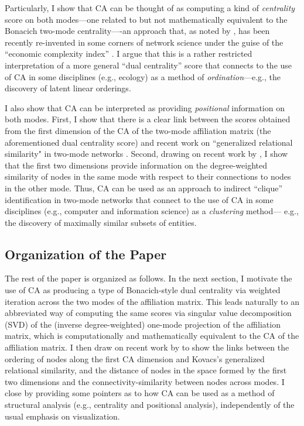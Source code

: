 \documentclass[a4paper,fleqn]{cas-sc}
\begin{document}
Particularly, I show that CA can be thought of as computing a kind of \textit{centrality} score on both modes---one related to but not mathematically equivalent to the Bonacich \citeyearpar{bonacich1991simultaneous} two-mode centrality----an approach that, as noted by \citet{van2021correspondence}, has been recently re-invented in some corners of network science under the guise of the ``economic complexity index'' \citep{hidalgo2009building, mealy2019interpreting}. I argue that this is a rather restricted interpretation of a more general ``dual centrality'' score that connects to the use of CA in some disciplines (e.g., ecology) as a method of \textit{ordination}---e.g., the discovery of latent linear orderings. 

I also show that CA can be interpreted as providing \textit{positional} information on both modes. First, I show that there is a clear link between the scores obtained from the first dimension of the CA of the two-mode affiliation matrix (the aforementioned dual centrality score) and recent work on ``generalized relational similarity" in two-mode networks \citep{kovacs2010generalized, lizardo2024two}. Second, drawing on recent work by \citet{van2021correspondence}, I show that the first two dimensions provide information on the degree-weighted similarity of nodes in the same mode with respect to their connections to nodes in the other mode. Thus, CA can be used as an approach to indirect ``clique'' identification in two-mode networks that connect to the use of CA in some disciplines (e.g., computer and information science) as a \textit{clustering} method--- e.g., the discovery of maximally similar subsets of entities. 

\subsection{Organization of the Paper}
The rest of the paper is organized as follows. In the next section, I motivate the use of CA as producing a type of Bonacich-style dual centrality via weighted iteration across the two modes of the affiliation matrix. This leads naturally to an abbreviated way of computing the same scores via singular value decomposition (SVD) of the (inverse degree-weighted) one-mode projection of the affiliation matrix, which is computationally and mathematically equivalent to the CA of the affiliation matrix. I then draw on recent work by \citet{van2021correspondence} to show the links between the ordering of nodes along the first CA dimension and Kovacs's generalized relational similarity, and the distance of nodes in the space formed by the first two dimensions and the connectivity-similarity between nodes across modes. I close by providing some pointers as to how CA can be used as a method of structural analysis (e.g., centrality and positional analysis), independently of the usual emphasis on visualization. 
\end{document}
